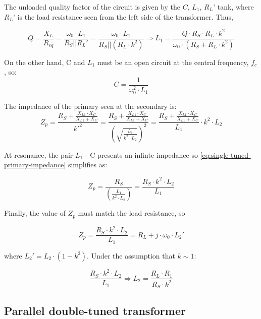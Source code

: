 \noindent The unloaded quality factor of the circuit is given by the $C$, $L_1$, $R_L’$ tank, where $R_L’$ is the load resistance seen from the left side of the transformer. Thus,

\begin{equation}
Q = \frac{X_L}{R_{eq}} = \frac{\omega_0 \cdot L_1}{R_S \lvert \lvert R_L'} = \frac{\omega_0 \cdot L_1}{R_S \lvert \lvert (R_L \cdot k^2)} \Longrightarrow L_1 = \frac{Q \cdot R_S \cdot R_L \cdot k^2}{\omega_0 \cdot (R_S + R_L \cdot k^2)}
\end{equation}

\noindent On the other hand, C and $L_1$ must be an open circuit at the central frequency, $f_c$, so:
\begin{equation}
C = \frac{1}{\omega_0^2 \cdot L_1}
\end{equation}

\noindent The impedance of the primary seen at the secondary is:
\begin{equation}
Z_p = \frac{R_S + \frac{X_{L1} \cdot X_C}{X_{L1} + X_C}}{k'^2} = \frac{R_S + \frac{X_{L1} \cdot X_C}{X_{L1} + X_C}}{\left( \sqrt{\frac{L_1}{k^2 \cdot L_2}}\right)^2} = \frac{R_S + \frac{X_{L1} \cdot X_C}{X_{L1} + X_C}}{L_1} \cdot k^2 \cdot L_2 
\label{eq:single-tuned-primary-impedance}
\end{equation}

\noindent At resonance, the pair $L_1$ - C presents an infinte impedance so \ref{eq:single-tuned-primary-impedance} simplifies as:

\begin{equation}
Z_p = \frac{R_S}{\left( \frac{L_1}{k^2 \cdot L_2} \right)} = \frac{R_S \cdot k^2 \cdot L_2}{L_1}
\end{equation}

\noindent Finally, the value of $Z_p$ must match the load resistance, so

\begin{equation}
Z_p = \frac{R_S \cdot k^2 \cdot L_2}{L_1} = R_L + j \cdot \omega_0 \cdot L_2'
\end{equation}

\noindent where $L_2' = L_2 \cdot (1 - k^2)$. Under the assumption that $k \sim 1$:

\begin{equation}
\frac{R_S \cdot k^2 \cdot L_2}{L_1} \Longrightarrow L_2 = \frac{R_L \cdot R_1}{R_S \cdot k^2}
\end{equation}

\subsection{Parallel double-tuned transformer}

